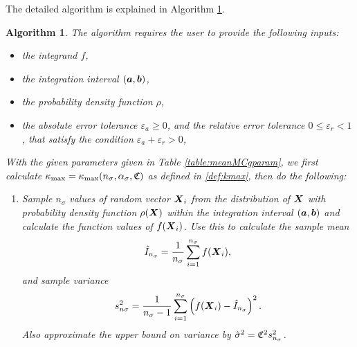 \documentclass{iitthesis}
\newtheorem{algorithm}[theorem]{Algorithm}
\theoremstyle{definition}
\begin{document}
The detailed algorithm is explained in Algorithm \ref{alg:cubMCg}.
\begin{algorithm}\label{alg:cubMCg} 
The algorithm requires the user to provide the following inputs:
\begin{itemize}
\item the integrand $f$,
\item the integration interval $(\boldsymbol{a}, \boldsymbol{b})$,
\item the probability density function $\rho$,
\item the absolute error tolerance $\varepsilon_a \geq 0$, and the relative error tolerance $0 \leq \varepsilon_r <1$, that satisfy the condition $\varepsilon_a+\varepsilon_r >0$,
\end{itemize} 
With the given parameters given in Table \ref{table:meanMCgparam}, we first calculate $\kappa_{\max}=\kappa_{\max}(n_\sigma,\alpha_\sigma,\mathfrak{C})$ as defined in \eqref{def:kmax}, then do the following:
\begin{enumerate}
\item Sample $n_\sigma$ values of random vector $\boldsymbol{X}_i$ from the distribution of $\boldsymbol{X}$ with probability density function $\rho(\boldsymbol{X})$ within the integration interval $(\boldsymbol{a}, \boldsymbol{b})$ and calculate the function values of $f(\boldsymbol{X}_i)$. Use this to calculate the sample mean $$\hat{I}_{n_\sigma} = \frac{1}{n_\sigma}\sum_{i=1}^{n_\sigma} f(\boldsymbol{X}_i),$$ and sample variance $$s_{n\sigma}^2 = \frac{1}{n_\sigma-1}\sum_{i=1}^{n_\sigma} \left(f(\boldsymbol{X}_i)-\hat{I}_{n_\sigma}\right)^2.$$ Also approximate the upper bound on variance by $\hat{\sigma}^2 = \mathfrak{C}^2 s^2_{n_\sigma}$. 


\end{enumerate}
\end{algorithm}
\end{document}
